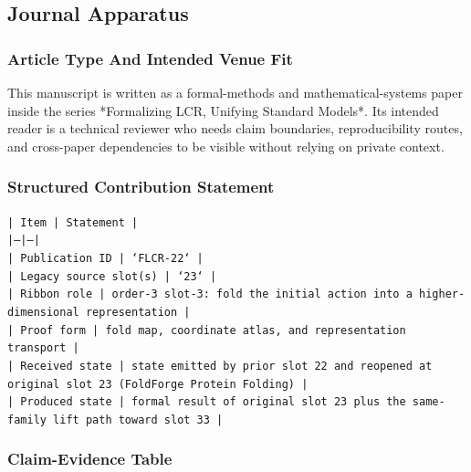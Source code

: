 \documentclass[11pt]{article}
\begin{document}
\subsection*{Journal Apparatus}

\subsubsection*{Article Type And Intended Venue Fit}

This manuscript is written as a formal-methods and mathematical-systems paper
inside the series *Formalizing LCR, Unifying Standard Models*. Its intended
reader is a technical reviewer who needs claim boundaries, reproducibility
routes, and cross-paper dependencies to be visible without relying on private
context.

\subsubsection*{Structured Contribution Statement}

\noindent\texttt{| Item | Statement |}\\
\noindent\texttt{|---|---|}\\
\noindent\texttt{| Publication ID | `FLCR-22` |}\\
\noindent\texttt{| Legacy source slot(s) | `23` |}\\
\noindent\texttt{| Ribbon role | order-3 slot-3: fold the initial action into a higher-dimensional representation |}\\
\noindent\texttt{| Proof form | fold map, coordinate atlas, and representation transport |}\\
\noindent\texttt{| Received state | state emitted by prior slot 22 and reopened at original slot 23 (FoldForge Protein Folding) |}\\
\noindent\texttt{| Produced state | formal result of original slot 23 plus the same-family lift path toward slot 33 |}\\

\subsubsection*{Claim-Evidence Table}
\end{document}
